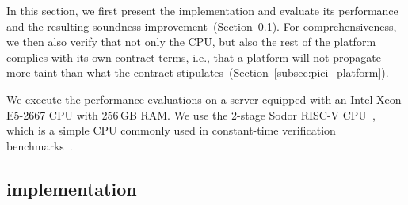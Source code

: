 In this section, we first present the \PICI implementation and evaluate its performance and the resulting soundness improvement~(Section~\ref{subsec:pici_impl}).
For comprehensiveness, we then also  verify that not only the CPU, but also the rest of the platform complies with its own contract terms, i.e., that a platform will not propagate more taint than what the contract stipulates~(Section~\ref{subsec:pici_platform}).

We execute the performance evaluations on a server equipped with an Intel Xeon E5-2667 CPU with 256\,GB RAM.
We use the 2-stage Sodor RISC-V CPU~\cite{sodor}, which is a simple CPU commonly used in constant-time verification benchmarks~\cite{wang2023specification,tan2025contractshadowlogic}.



\subsection{\PICI implementation}
\label{subsec:pici_impl}

